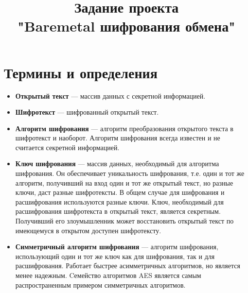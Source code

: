 \documentclass[14pt]{extarticle}
\title{Задание проекта \\ "Baremetal шифрования обмена"}
\begin{document}
\maketitle

\tableofcontents

\clearpage

\section{Термины и определения}

\begin{itemize}

 \item \textbf{Открытый текст} --- массив данных с секретной информацией\footnotemark{}.


 \item \textbf{Шифротекст} --- шифрованный открытый текст\footnotemark{}.


 \item \textbf{Алгоритм шифрования} --- алгоритм преобразования открытого текста
  в шифротекст и наоборот\footnotemark{}.
  Алгоритм шифрования всегда известен и не считается секретной информацией.


 \item \textbf{Ключ шифрования} --- массив данных, необходимый для алгоритма
  шифрования\footnotemark{}.
  Он обеспечивает уникальность шифрования, т.е. один и тот же алгоритм, получивший
  на вход один и тот же открытый текст, но разные ключи, даст разные шифротексты.
  В общем случае для шифрования и расшифрования используются разные ключи.
  Ключ, необходимый для расшифрования шифротекста в открытый текст, является секретным.
  Получивший его злоумышленник может восстановить открытый текст по имеющемуся
  в открытом доступен шифротексту.


 \item \textbf{Симметричный алгоритм шифрования} --- алгоритм шифрования,
  использующий один и тот же ключ как для шифрования, так и для расшифрования.
  Работает быстрее асимметричных алгоритмов, но является менее надежным.
  Cемейство алгоритмов AES\footnotemark{} является самым распространенным примером симметричных
  алгоритмов.


\end{itemize}
\end{document}
